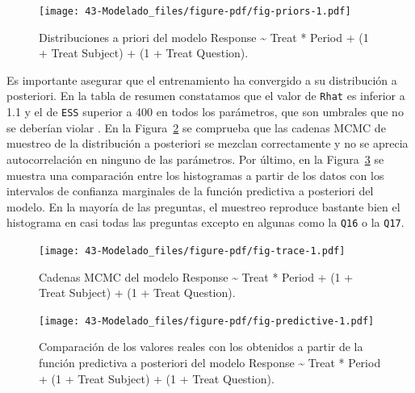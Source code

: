 \documentclass[
  12pt,
  a4paper,
  extrafontsizes,
  onecolumn,
  openright]{memoir}
\begin{document}
\normalsize

\begin{figure}[h]

{\centering \texttt{[image: 43-Modelado\_files/figure-pdf/fig-priors-1.pdf]}

}

\caption{\label{fig-priors}Distribuciones a priori del modelo Response
\textasciitilde{} Treat * Period + (1 + Treat \textbar{} Subject) + (1 +
Treat \textbar{} Question).}

\end{figure}

Es importante asegurar que el entrenamiento ha convergido a su
distribución a posteriori. En la tabla de resumen constatamos que el
valor de \texttt{Rhat} es inferior a 1.1 y el de \texttt{ESS} superior a
400 en todos los parámetros, que son umbrales que no se deberían violar
\autocite[ver][]{burkner2019}. En la Figura~\ref{fig-trace} se comprueba
que las cadenas MCMC de muestreo de la distribución a posteriori se
mezclan correctamente y no se aprecia autocorrelación en ninguno de las
parámetros. Por último, en la Figura~\ref{fig-predictive} se muestra una
comparación entre los histogramas a partir de los datos con los
intervalos de confianza marginales de la función predictiva a posteriori
del modelo. En la mayoría de las preguntas, el muestreo reproduce
bastante bien el histograma en casi todas las preguntas excepto en
algunas como la \texttt{Q16} o la \texttt{Q17}.

\begin{figure}[h]

{\centering \texttt{[image: 43-Modelado\_files/figure-pdf/fig-trace-1.pdf]}

}

\caption{\label{fig-trace}Cadenas MCMC del modelo Response
\textasciitilde{} Treat * Period + (1 + Treat \textbar{} Subject) + (1 +
Treat \textbar{} Question).}

\end{figure}

\begin{figure}[h]

{\centering \texttt{[image: 43-Modelado\_files/figure-pdf/fig-predictive-1.pdf]}

}

\caption{\label{fig-predictive}Comparación de los valores reales con los
obtenidos a partir de la función predictiva a posteriori del modelo
Response \textasciitilde{} Treat * Period + (1 + Treat \textbar{}
Subject) + (1 + Treat \textbar{} Question).}

\end{figure}
\end{document}
